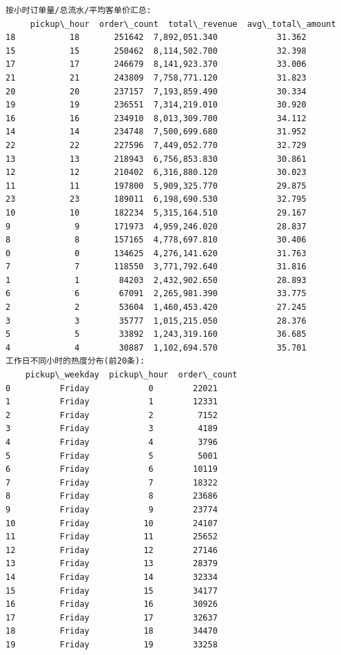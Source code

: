 \documentclass[11pt]{article}
\begin{document}
    \begin{Verbatim}[commandchars=\\\{\}]
按小时订单量/总流水/平均客单价汇总:
     pickup\_hour  order\_count  total\_revenue  avg\_total\_amount
18           18       251642  7,892,051.340            31.362
15           15       250462  8,114,502.700            32.398
17           17       246679  8,141,923.370            33.006
21           21       243809  7,758,771.120            31.823
20           20       237157  7,193,859.490            30.334
19           19       236551  7,314,219.010            30.920
16           16       234910  8,013,309.700            34.112
14           14       234748  7,500,699.680            31.952
22           22       227596  7,449,052.770            32.729
13           13       218943  6,756,853.830            30.861
12           12       210402  6,316,880.120            30.023
11           11       197800  5,909,325.770            29.875
23           23       189011  6,198,690.530            32.795
10           10       182234  5,315,164.510            29.167
9             9       171973  4,959,246.020            28.837
8             8       157165  4,778,697.810            30.406
0             0       134625  4,276,141.620            31.763
7             7       118550  3,771,792.640            31.816
1             1        84203  2,432,902.650            28.893
6             6        67091  2,265,981.390            33.775
2             2        53604  1,460,453.420            27.245
3             3        35777  1,015,215.050            28.376
5             5        33892  1,243,319.160            36.685
4             4        30887  1,102,694.570            35.701
工作日不同小时的热度分布(前20条):
    pickup\_weekday  pickup\_hour  order\_count
0          Friday            0        22021
1          Friday            1        12331
2          Friday            2         7152
3          Friday            3         4189
4          Friday            4         3796
5          Friday            5         5001
6          Friday            6        10119
7          Friday            7        18322
8          Friday            8        23686
9          Friday            9        23774
10         Friday           10        24107
11         Friday           11        25652
12         Friday           12        27146
13         Friday           13        28379
14         Friday           14        32334
15         Friday           15        34177
16         Friday           16        30926
17         Friday           17        32637
18         Friday           18        34470
19         Friday           19        33258
    \end{Verbatim}
\end{document}
